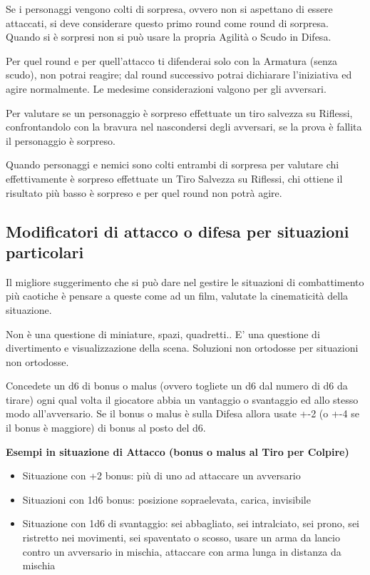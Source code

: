 \documentclass[a4paper,11pt,twoside,openany]{book}
\begin{document}
Se i personaggi vengono colti di sorpresa, ovvero non si aspettano di essere attaccati, si deve considerare questo primo round come round di sorpresa. Quando si è sorpresi non si può usare la propria Agilità o Scudo in Difesa.

Per quel round e per quell'attacco ti difenderai solo con la Armatura (senza scudo), non potrai reagire; dal round successivo potrai dichiarare l'iniziativa ed agire normalmente. Le medesime considerazioni valgono per gli avversari.

Per valutare se un personaggio è sorpreso effettuate un tiro salvezza su Riflessi, confrontandolo con la bravura nel nascondersi degli avversari, se la prova è fallita il personaggio è sorpreso.

Quando personaggi e nemici sono colti entrambi di sorpresa per valutare chi effettivamente è sorpreso effettuate un Tiro Salvezza su Riflessi, chi ottiene il risultato più basso è sorpreso e per quel round non potrà agire.

\subsection{Modificatori di attacco o difesa per situazioni particolari} 

Il migliore suggerimento che si può dare nel gestire le situazioni di combattimento più caotiche è pensare a queste come ad un film, valutate la cinematicità della situazione.

Non è una questione di miniature, spazi, quadretti.. E' una questione di divertimento e visualizzazione della scena. Soluzioni non ortodosse per situazioni non ortodosse.

Concedete un d6 di bonus o malus (ovvero togliete un d6 dal numero di d6 da tirare) ogni qual volta il giocatore abbia un vantaggio o svantaggio ed allo stesso modo all'avversario. Se il bonus o malus è sulla Difesa allora usate +-2 (o +-4 se il bonus è maggiore) di bonus al posto del d6.

\bigskip

\textbf{Esempi in situazione di Attacco (bonus o malus al Tiro per Colpire)}

\begin{itemize}
	\item Situazione con +2 bonus: più di uno ad attaccare un avversario

	\item Situazioni con 1d6 bonus: posizione sopraelevata, carica, invisibile

	\item Situazione con 1d6 di svantaggio: sei abbagliato, sei intralciato, sei prono, sei ristretto nei movimenti, sei spaventato o scosso, usare un arma da lancio contro un avversario in mischia, attaccare con arma lunga in distanza da mischia
\end{itemize}
\end{document}
